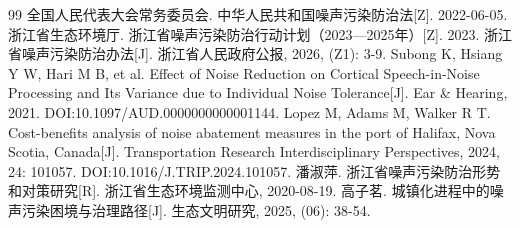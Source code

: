 \newpage

\begin{thebibliography}{99}
 全国人民代表大会常务委员会. 中华人民共和国噪声污染防治法[Z]. 2022-06-05.
 浙江省生态环境厅. 浙江省噪声污染防治行动计划（2023—2025年）[Z]. 2023.
 浙江省噪声污染防治办法[J]. 浙江省人民政府公报, 2026, (Z1): 3-9.
 Subong K, Hsiang Y W, Hari M B, et al. Effect of Noise Reduction on Cortical Speech-in-Noise Processing and Its Variance due to Individual Noise Tolerance[J]. Ear \& Hearing, 2021. DOI:10.1097/AUD.0000000000001144.
 Lopez M, Adams M, Walker R T. Cost-benefits analysis of noise abatement measures in the port of Halifax, Nova Scotia, Canada[J]. Transportation Research Interdisciplinary Perspectives, 2024, 24: 101057. DOI:10.1016/J.TRIP.2024.101057.
 潘淑萍. 浙江省噪声污染防治形势和对策研究[R]. 浙江省生态环境监测中心, 2020-08-19.
 高子茗. 城镇化进程中的噪声污染困境与治理路径[J]. 生态文明研究, 2025, (06): 38-54.
\end{thebibliography}
